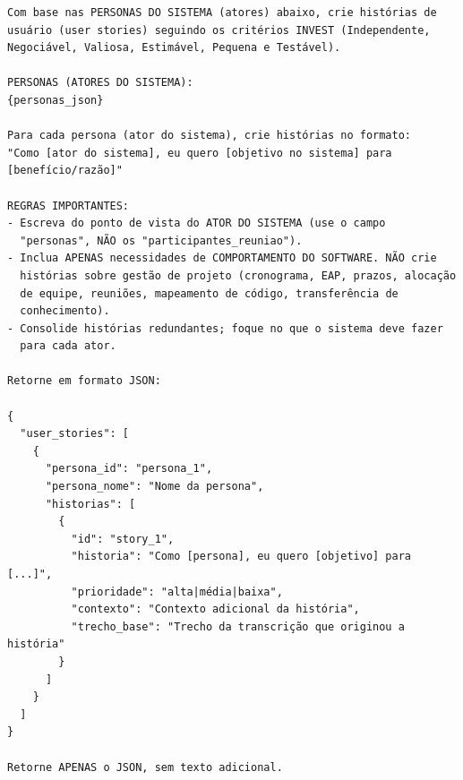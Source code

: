 {\footnotesize
\begin{verbatim}
Com base nas PERSONAS DO SISTEMA (atores) abaixo, crie histórias de
usuário (user stories) seguindo os critérios INVEST (Independente,
Negociável, Valiosa, Estimável, Pequena e Testável).

PERSONAS (ATORES DO SISTEMA):
{personas_json}

Para cada persona (ator do sistema), crie histórias no formato:
"Como [ator do sistema], eu quero [objetivo no sistema] para
[benefício/razão]"

REGRAS IMPORTANTES:
- Escreva do ponto de vista do ATOR DO SISTEMA (use o campo
  "personas", NÃO os "participantes_reuniao").
- Inclua APENAS necessidades de COMPORTAMENTO DO SOFTWARE. NÃO crie
  histórias sobre gestão de projeto (cronograma, EAP, prazos, alocação
  de equipe, reuniões, mapeamento de código, transferência de
  conhecimento).
- Consolide histórias redundantes; foque no que o sistema deve fazer
  para cada ator.

Retorne em formato JSON:

{
  "user_stories": [
    {
      "persona_id": "persona_1",
      "persona_nome": "Nome da persona",
      "historias": [
        {
          "id": "story_1",
          "historia": "Como [persona], eu quero [objetivo] para [...]",
          "prioridade": "alta|média|baixa",
          "contexto": "Contexto adicional da história",
          "trecho_base": "Trecho da transcrição que originou a história"
        }
      ]
    }
  ]
}

Retorne APENAS o JSON, sem texto adicional.
\end{verbatim}
}

